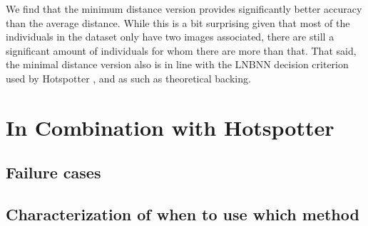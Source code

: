 We find that the minimum distance version provides significantly better accuracy than the average distance. %
While this is a bit surprising given that most of the individuals in the dataset only have two images associated, there are still a significant amount of individuals for whom there are more than that.
That said, the minimal distance version also is in line with the LNBNN decision criterion used by Hotspotter \cite{crall_hotspotter_2013}, and as such as theoretical backing. %

\section{In Combination with Hotspotter}

\subsection{Failure cases}

\subsection{Characterization of when to use which method}


